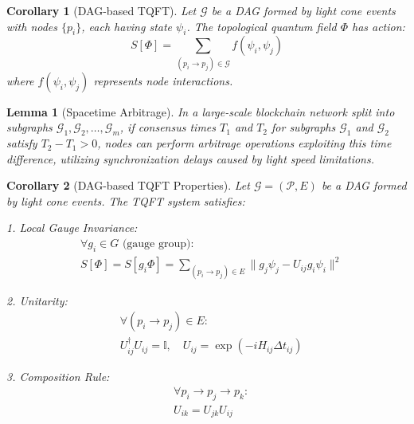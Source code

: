 \documentclass{article}
\newtheorem{lemma}{Lemma}
\newtheorem{corollary}{Corollary}
\begin{document}
\begin{corollary}[DAG-based TQFT]
Let $\mathcal{G}$ be a DAG formed by light cone events with nodes $\{p_i\}$, each having state $\psi_i$. The topological quantum field $\Phi$ has action:
\[ S[\Phi] = \sum_{(p_i \to p_j) \in \mathcal{G}} f(\psi_i, \psi_j) \]
where $f(\psi_i, \psi_j)$ represents node interactions.
\end{corollary}

\begin{lemma}[Spacetime Arbitrage]
In a large-scale blockchain network split into subgraphs $\mathcal{G}_1, \mathcal{G}_2, \dots, \mathcal{G}_m$, if consensus times $T_1$ and $T_2$ for subgraphs $\mathcal{G}_1$ and $\mathcal{G}_2$ satisfy $T_2 - T_1 > 0$, nodes can perform arbitrage operations exploiting this time difference, utilizing synchronization delays caused by light speed limitations.
\end{lemma}

\begin{corollary}[DAG-based TQFT Properties]
Let $\mathcal{G} = (\mathcal{P}, E)$ be a DAG formed by light cone events. The TQFT system satisfies:

1. Local Gauge Invariance:
\begin{align*}
    &\forall g_i \in G \text{ (gauge group)}: \\
    &S[\Phi] = S[g_i\Phi] = \sum_{(p_i \to p_j) \in E} \|g_j\psi_j - U_{ij}g_i\psi_i\|^2
\end{align*}

2. Unitarity:
\begin{align*}
    &\forall (p_i \to p_j) \in E: \\
    &U_{ij}^\dagger U_{ij} = \mathbb{I}, \quad U_{ij} = \exp(-iH_{ij}\Delta t_{ij})
\end{align*}

3. Composition Rule:
\begin{align*}
    &\forall p_i \to p_j \to p_k: \\
    &U_{ik} = U_{jk}U_{ij}
\end{align*}
\end{corollary}
\end{document}

